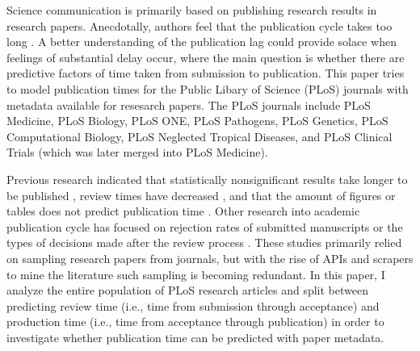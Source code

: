 Science communication is primarily based on publishing research results in research papers. Anecdotally, authors feel that the publication cycle takes too long \cite{Himmelstein2015-me}. A better understanding of the publication lag could provide solace when feelings of substantial delay occur, where the main question is whether there are predictive factors of time taken from submission to publication. This paper tries to model publication times for the Public Libary of Science (PLoS) journals with metadata available for resesarch papers. The PLoS journals include PLoS Medicine, PLoS Biology, PLoS ONE, PLoS Pathogens, PLoS Genetics, PLoS Computational Biology, PLoS Neglected Tropical Diseases, and PLoS Clinical Trials (which was later merged into PLoS Medicine).

Previous research indicated that statistically nonsignificant results take longer to be published \cite{ioannidis1998}, review times have decreased \cite{lyman2013}, and that the amount of figures or tables does not predict publication time \cite{lee2013}. Other research into academic publication cycle has focused on rejection rates of submitted manuscripts or the types of decisions made after the review process \cite{Rosenkrantz2015-uj}. These studies primarily relied on sampling research papers from journals, but with the rise of APIs and scrapers to mine the literature \cite{Smith-Unna2014-cd} such sampling is becoming redundant. In this paper, I analyze the entire population of PLoS research articles and split between predicting review time (i.e., time from submission through acceptance) and production time (i.e., time from acceptance through publication) in order to investigate whether publication time can be predicted with paper metadata. 
  
  
  
  